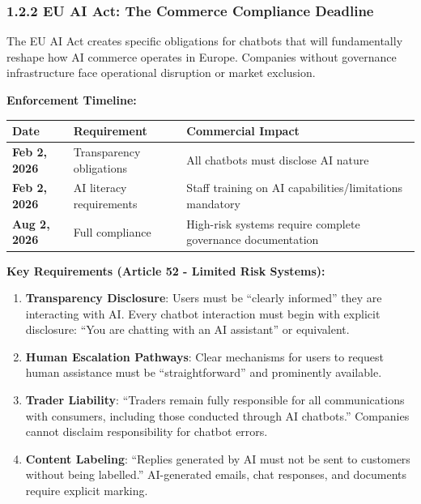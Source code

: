 \subsubsection{1.2.2 EU AI Act: The Commerce Compliance
Deadline}\label{eu-ai-act-the-commerce-compliance-deadline}

The EU AI Act creates specific obligations for chatbots that will
fundamentally reshape how AI commerce operates in Europe. Companies
without governance infrastructure face operational disruption or market
exclusion.

\textbf{Enforcement Timeline:}

{\def\LTcaptype{none} %
\begin{longtable}[]{@{}
  >{\raggedright\arraybackslash}p{}
  >{\raggedright\arraybackslash}p{}
  >{\raggedright\arraybackslash}p{}@{}}
\toprule\noalign{}
\begin{minipage}[b]{\linewidth}\raggedright
Date
\end{minipage} & \begin{minipage}[b]{\linewidth}\raggedright
Requirement
\end{minipage} & \begin{minipage}[b]{\linewidth}\raggedright
Commercial Impact
\end{minipage} \\
\midrule\noalign{}
\endhead
\bottomrule\noalign{}
\endlastfoot
\textbf{Feb 2, 2026} & Transparency obligations & All chatbots must
disclose AI nature \\
\textbf{Feb 2, 2026} & AI literacy requirements & Staff training on AI
capabilities/limitations mandatory \\
\textbf{Aug 2, 2026} & Full compliance & High-risk systems require
complete governance documentation \\
\end{longtable}
}

\textbf{Key Requirements (Article 52 - Limited Risk Systems):}

\begin{enumerate}
\def\labelenumi{\arabic{enumi}.}
\item
  \textbf{Transparency Disclosure}: Users must be ``clearly informed''
  they are interacting with AI. Every chatbot interaction must begin
  with explicit disclosure: ``You are chatting with an AI assistant'' or
  equivalent.
\item
  \textbf{Human Escalation Pathways}: Clear mechanisms for users to
  request human assistance must be ``straightforward'' and prominently
  available.
\item
  \textbf{Trader Liability}: ``Traders remain fully responsible for all
  communications with consumers, including those conducted through AI
  chatbots.'' Companies cannot disclaim responsibility for chatbot
  errors.
\item
  \textbf{Content Labeling}: ``Replies generated by AI must not be sent
  to customers without being labelled.'' AI-generated emails, chat
  responses, and documents require explicit marking.
\end{enumerate}

